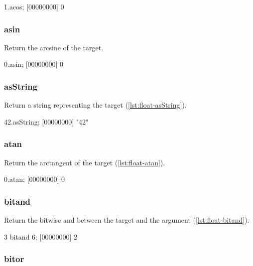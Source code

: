 \begin{urbiscript}[caption=Float.acos, label=lst:float-acos]
1.acos;
[00000000] 0
\end{urbiscript}

\subsubsection{asin}

Return the arcsine of the target.

\begin{urbiscript}[caption=Float.asin, label=lst:float-asin]
0.asin;
[00000000] 0
\end{urbiscript}

\subsubsection{asString}

Return a string representing the target (\autoref{lst:float-asString}).

\begin{urbiscript}[caption=Float.asString, label=lst:float-asString]
42.asString;
[00000000] "42"
\end{urbiscript}

\subsubsection{atan}

Return the arctangent of the target (\autoref{lst:float-atan}).

\begin{urbiscript}[caption=Float.atan, label=lst:float-atan]
0.atan;
[00000000] 0
\end{urbiscript}

\subsubsection{bitand}

Return the bitwise and between the target and the argument (\autoref{lst:float-bitand}).

\begin{urbiscript}[caption=Float.bitand, label=lst:float-bitand]
3 bitand 6;
[00000000] 2
\end{urbiscript}

\subsubsection{bitor}

